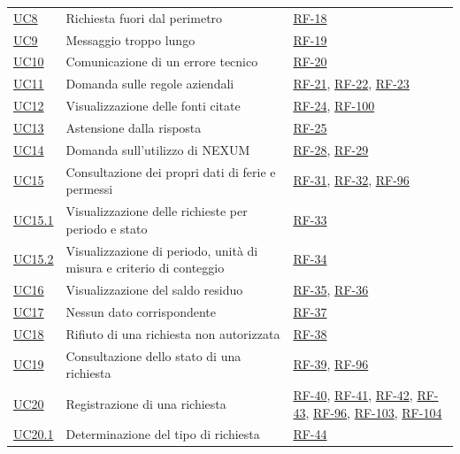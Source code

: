 \documentclass[documento]{gpt}
\begin{document}
{\begin{longtable}{@{}p{1.4cm}>{\raggedright\arraybackslash}p{9.2cm}>{\raggedright\arraybackslash}p{4.2cm}@{}}
\hyperref[uc:fuori_ambito]{UC8} & Richiesta fuori dal perimetro & \hyperlink{req:RF-18}{RF-18} \\
\hyperref[uc:msg_lungo]{UC9} & Messaggio troppo lungo & \hyperlink{req:RF-19}{RF-19} \\
\hyperref[uc:errore_tecnico]{UC10} & Comunicazione di un errore tecnico & \hyperlink{req:RF-20}{RF-20} \\
\hyperref[uc:regole]{UC11} & Domanda sulle regole aziendali & \hyperlink{req:RF-21}{RF-21}, \hyperlink{req:RF-22}{RF-22}, \hyperlink{req:RF-23}{RF-23} \\
\hyperref[uc:fonti]{UC12} & Visualizzazione delle fonti citate & \hyperlink{req:RF-24}{RF-24}, \hyperlink{req:RF-100}{RF-100} \\
\hyperref[uc:astensione]{UC13} & Astensione dalla risposta & \hyperlink{req:RF-25}{RF-25} \\
\hyperref[uc:prodotto]{UC14} & Domanda sull'utilizzo di NEXUM & \hyperlink{req:RF-28}{RF-28}, \hyperlink{req:RF-29}{RF-29} \\
\hyperref[uc:dati]{UC15} & Consultazione dei propri dati di ferie e permessi & \hyperlink{req:RF-31}{RF-31}, \hyperlink{req:RF-32}{RF-32}, \hyperlink{req:RF-96}{RF-96} \\
\hyperref[uc:dati_riep]{UC15.1} & Visualizzazione delle richieste per periodo e stato & \hyperlink{req:RF-33}{RF-33} \\
\hyperref[uc:dati_criteri]{UC15.2} & Visualizzazione di periodo, unità di misura e criterio di conteggio & \hyperlink{req:RF-34}{RF-34} \\
\hyperref[uc:saldo]{UC16} & Visualizzazione del saldo residuo & \hyperlink{req:RF-35}{RF-35}, \hyperlink{req:RF-36}{RF-36} \\
\hyperref[uc:nessun_dato]{UC17} & Nessun dato corrispondente & \hyperlink{req:RF-37}{RF-37} \\
\hyperref[uc:non_aut]{UC18} & Rifiuto di una richiesta non autorizzata & \hyperlink{req:RF-38}{RF-38} \\
\hyperref[uc:stato_rich]{UC19} & Consultazione dello stato di una richiesta & \hyperlink{req:RF-39}{RF-39}, \hyperlink{req:RF-96}{RF-96} \\
\hyperref[uc:registra]{UC20} & Registrazione di una richiesta & \hyperlink{req:RF-40}{RF-40}, \hyperlink{req:RF-41}{RF-41}, \hyperlink{req:RF-42}{RF-42}, \hyperlink{req:RF-43}{RF-43}, \hyperlink{req:RF-96}{RF-96}, \hyperlink{req:RF-103}{RF-103}, \hyperlink{req:RF-104}{RF-104} \\
\hyperref[uc:reg_tipo]{UC20.1} & Determinazione del tipo di richiesta & \hyperlink{req:RF-44}{RF-44} \\

\end{longtable}}
\end{document}
